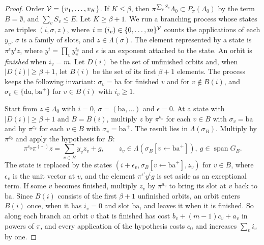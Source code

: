 \begin{proof}
Order $\mathcal V=\{v_1,\dots,v_K\}$. If $K\le\beta$, then $\pi^{\sum_vS_v}\Lambda_0\subset P_\pi(\Lambda_0)$ by the term $B=\emptyset$, and $\sum_vS_v\le E$. Let $K\ge\beta+1$. We run a branching process whose states are triples $(i,\sigma,z)$, where $i=(i_v)\in\{0,\dots,m\}^{\mathcal V}$ counts the applications of each $y_v$, $\sigma$ is a family of slots, and $z\in\Lambda(\sigma)$. The element represented by a state is $\pi^{\epsilon}y^iz$, where $y^i=\prod_vy_v^{i_v}$ and $\epsilon$ is an exponent attached to the state. An orbit is \emph{finished} when $i_v=m$. Let $D(i)$ be the set of unfinished orbits and, when $\lvert D(i)\rvert\ge\beta+1$, let $B(i)$ be the set of its first $\beta+1$ elements. The process keeps the following invariant: $\sigma_v=\mathrm{ba}$ for finished $v$ and for $v\notin B(i)$, and $\sigma_v\in\{\mathrm{du},\mathrm{ba}^+\}$ for $v\in B(i)$ with $i_v\ge1$.

Start from $z\in\Lambda_0$ with $i=0$, $\sigma=(\mathrm{ba},\dots)$ and $\epsilon=0$. At a state with $\lvert D(i)\rvert\ge\beta+1$ and $B=B(i)$, multiply $z$ by $\pi^{b_v}$ for each $v\in B$ with $\sigma_v=\mathrm{ba}$ and by $\pi^{c_v}$ for each $v\in B$ with $\sigma_v=\mathrm{ba}^+$. The result lies in $\Lambda(\sigma_B)$. Multiply by $\pi^{c_0}$ and apply the hypothesis for $B$:
\[
\pi^{c_0}\pi^{(\cdots)}z=\sum_{v\in B}y_vz_v+g,\qquad z_v\in\Lambda(\sigma_B[v\leftarrow\mathrm{ba}^+]),\ g\in\operatorname{span}G_B .
\]
The state is replaced by the states $(i+\epsilon_v,\sigma_B[v\leftarrow\mathrm{ba}^+],z_v)$ for $v\in B$, where $\epsilon_v$ is the unit vector at $v$, and the element $\pi^{\epsilon'}y^ig$ is set aside as an exceptional term. If some $v$ becomes finished, multiply $z_v$ by $\pi^{a_v}$ to bring its slot at $v$ back to $\mathrm{ba}$. Since $B(i)$ consists of the first $\beta+1$ unfinished orbits, an orbit enters $B(i)$ once, when it has $i_v=0$ and slot $\mathrm{ba}$, and leaves it when it is finished. So along each branch an orbit $v$ that is finished has cost $b_v+(m-1)c_v+a_v$ in powers of $\pi$, and every application of the hypothesis costs $c_0$ and increases $\sum_vi_v$ by one.


\end{proof}
